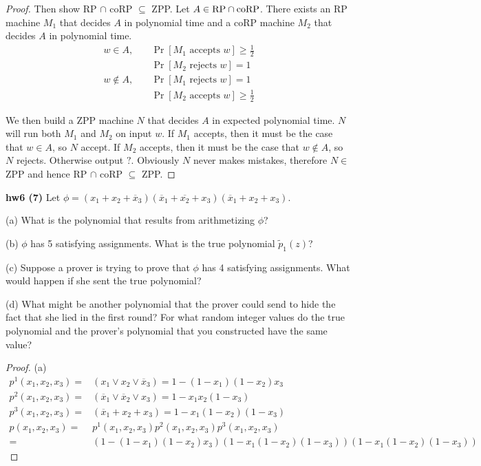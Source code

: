 \begin{mdframed}
\begin{proof}
\medskip
Then show RP $\cap$ coRP $\subseteq$ ZPP. Let $A \in \text{RP} \cap \text{coRP}$. There exists an RP machine $M_1$ that decides $A$ in polynomial time and a coRP machine $M_2$ that decides $A$ in polynomial time.
\begin{align*}
w \in A, & \quad \Pr[M_1 \text{ accepts } w] \geq \frac{1}{2} \\
& \quad \Pr[M_2 \text{ rejects } w] = 1 \\
w \not \in A, & \quad \Pr[M_1 \text{ rejects } w] = 1  \\
& \quad \Pr[M_2 \text{ accepts } w] \geq \frac{1}{2}
\end{align*}

We then build a ZPP machine $N$ that decides $A$ in expected polynomial time. $N$ will run both $M_1$ and $M_2$ on input $w$. If $M_1$ accepts, then it must be the case that $w \in A$, so $N$ accept. If $M_2$ accepts, then it must be the case that $w \not \in A$, so $N$ rejects. Otherwise output $?$. Obviously $N$ never makes mistakes, therefore $N \in$ ZPP and hence RP $\cap$ coRP $\subseteq$ ZPP.
\end{proof}
\end{mdframed}

\textbf{hw6 (7)} Let $\phi = (x_1 + x_2 + \overline{x}_3)(\overline{x}_1 + \overline{x_2} + x_3)(\overline{x}_1 + x_2 + x_3)$.

(a) What is the polynomial that results from arithmetizing $\phi$?

(b) $\phi$ has 5 satisfying assignments. What is the true polynomial $\tilde{p}_1(z)$?

(c) Suppose a prover is trying to prove that $\phi$ has 4 satisfying assignments. What would happen if she sent the true polynomial?

(d) What might be another polynomial that the prover could send to hide the fact that she lied in the first round? For what random integer values do the true polynomial and the prover’s polynomial that you constructed have the same value?

\begin{mdframed}
\begin{proof}

(a) 
\begin{align*}
p^1(x_1, x_2, x_3) =& (x_1 \vee x_2 \vee \overline{x}_3) = 1 - (1-x_1)(1-x_2) x_3 \\
p^2(x_1, x_2, x_3) =& (\overline{x}_1 \vee \overline{x}_2 \vee x_3) = 1 - x_1 x_2 (1 - x_3)\\
p^3(x_1, x_2, x_3) = &(\overline{x}_1 + x_2 + x_3) = 1 - x_1(1-x_2)(1-x_3) \\
p(x_1, x_2, x_3) = &p^1(x_1, x_2, x_3) p^2(x_1, x_2, x_3) p^3(x_1, x_2, x_3)\\
=& (1 - (1-x_1)(1-x_2) x_3)(1 - x_1(1-x_2)(1-x_3))(1 - x_1(1-x_2)(1-x_3))
\end{align*}

\end{proof}
\end{mdframed}